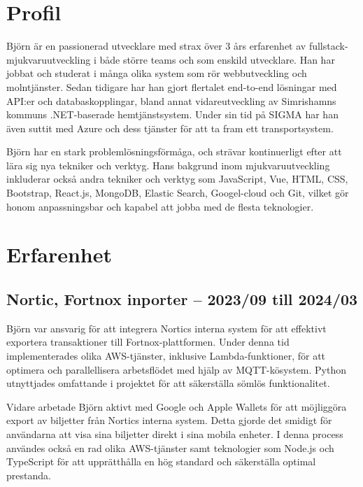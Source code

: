 \documentclass{article}
\begin{document}
\noindent
\begin{minipage}[t]{0.7\textwidth}
\vspace{-20pt} %
\section*{\textcolor{colorBlue}{Profil}}
Björn är en passionerad utvecklare med strax över 3 års erfarenhet av fullstack-
mjukvaruutveckling i både större teams och som enskild utvecklare. 
Han har jobbat och studerat i många olika system som rör webbutveckling och molntjänster. 
Sedan tidigare har han gjort flertalet end-to-end lösningar med API:er och databaskopplingar, 
bland annat vidareutveckling av Simrishamns kommuns .NET-baserade hemtjänstsystem. 
Under sin tid på SIGMA har han även suttit med Azure och dess tjänster för att ta fram ett transportsystem.

\vspace{10pt}
Björn har en stark problemlösningsförmåga, och strävar kontinuerligt efter att lära 
sig nya tekniker och verktyg. Hans bakgrund inom mjukvaruutveckling inkluderar 
också andra tekniker och verktyg som JavaScript, Vue, HTML, CSS, Bootstrap, React.js, MongoDB,
 Elastic Search, Googel-cloud och Git, vilket gör honom anpassningsbar och 
 kapabel att jobba med de flesta teknologier.

\vspace{10pt} %
\section*{\textcolor{colorBlue}{Erfarenhet}}

\subsection*{\textcolor{colorTitelErfarenhet}{Nortic, Fortnox inporter – 2023/09 till 2024/03}}

Björn var ansvarig för att integrera Nortics interna system för att effektivt exportera transaktioner till Fortnox-plattformen. Under denna tid implementerades olika AWS-tjänster, inklusive Lambda-funktioner, för att optimera och parallellisera arbetsflödet med hjälp av MQTT-kösystem. Python utnyttjades omfattande i projektet för att säkerställa sömlös funktionalitet.

Vidare arbetade Björn aktivt med Google och Apple Wallets för att möjliggöra export av biljetter från Nortics interna system. Detta gjorde det smidigt för användarna att visa sina biljetter direkt i sina mobila enheter. I denna process användes också en rad olika AWS-tjänster samt teknologier som Node.js och TypeScript för att upprätthålla en hög standard och säkerställa optimal prestanda.


\end{minipage}
\end{document}
